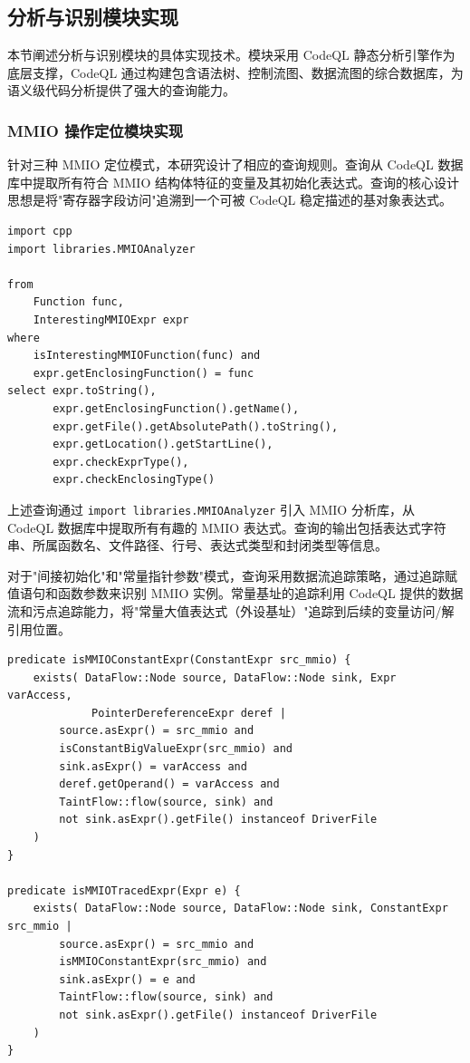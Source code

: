 \subsection{分析与识别模块实现}

本节阐述分析与识别模块的具体实现技术。模块采用 CodeQL 静态分析引擎作为底层支撑，CodeQL 通过构建包含语法树、控制流图、数据流图的综合数据库，为语义级代码分析提供了强大的查询能力。

\subsubsection{MMIO 操作定位模块实现}

针对三种 MMIO 定位模式，本研究设计了相应的查询规则。查询从 CodeQL 数据库中提取所有符合 MMIO 结构体特征的变量及其初始化表达式。查询的核心设计思想是将"寄存器字段访问"追溯到一个可被 CodeQL 稳定描述的基对象表达式。

\begin{lstlisting}[style=CodeQL,language=CodeQL, caption={MMIO表达式收集查询示例}]
import cpp
import libraries.MMIOAnalyzer

from
    Function func,
    InterestingMMIOExpr expr
where
    isInterestingMMIOFunction(func) and
    expr.getEnclosingFunction() = func
select expr.toString(),
       expr.getEnclosingFunction().getName(),
       expr.getFile().getAbsolutePath().toString(),
       expr.getLocation().getStartLine(),
       expr.checkExprType(),
       expr.checkEnclosingType()
\end{lstlisting}

上述查询通过 \texttt{import libraries.MMIOAnalyzer} 引入 MMIO 分析库，从 CodeQL 数据库中提取所有有趣的 MMIO 表达式。查询的输出包括表达式字符串、所属函数名、文件路径、行号、表达式类型和封闭类型等信息。

对于"间接初始化"和"常量指针参数"模式，查询采用数据流追踪策略，通过追踪赋值语句和函数参数来识别 MMIO 实例。常量基址的追踪利用 CodeQL 提供的数据流和污点追踪能力，将"常量大值表达式（外设基址）"追踪到后续的变量访问/解引用位置。

\begin{lstlisting}[style=CodeQL,language=CodeQL, caption={常量基址数据流追踪查询示例}]
 predicate isMMIOConstantExpr(ConstantExpr src_mmio) {
    exists( DataFlow::Node source, DataFlow::Node sink, Expr varAccess,
             PointerDereferenceExpr deref |
        source.asExpr() = src_mmio and
        isConstantBigValueExpr(src_mmio) and
        sink.asExpr() = varAccess and
        deref.getOperand() = varAccess and
        TaintFlow::flow(source, sink) and
        not sink.asExpr().getFile() instanceof DriverFile
    )
}

predicate isMMIOTracedExpr(Expr e) {
    exists( DataFlow::Node source, DataFlow::Node sink, ConstantExpr src_mmio |
        source.asExpr() = src_mmio and
        isMMIOConstantExpr(src_mmio) and
        sink.asExpr() = e and
        TaintFlow::flow(source, sink) and
        not sink.asExpr().getFile() instanceof DriverFile
    )
}
\end{lstlisting}

